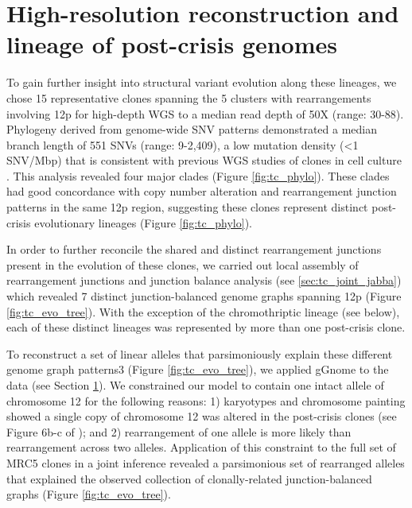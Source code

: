 \documentclass[phd,tocprelim]{cornell}
\renewcommand{\caption}[1]{\singlespacing\hangcaption{#1}\normalspacing}
\begin{document}


\section{High-resolution reconstruction and lineage of post-crisis genomes} \label{sec:tc_joint_decomposition}
To gain further insight into structural variant evolution along these lineages, we chose 15 representative clones spanning the 5 clusters with rearrangements involving 12p for high-depth WGS to a median read depth of 50X (range: 30-88). Phylogeny derived from genome-wide SNV patterns demonstrated a median branch length of 551 SNVs (range: 9-2,409), a low mutation density (<1 SNV/Mbp) that is consistent with previous WGS studies of clones in cell culture \cite{Petljak2019-cf}. This analysis revealed four major clades (Figure \ref{fig:tc_phylo}). These clades had good concordance with copy number alteration and rearrangement junction patterns in the same 12p region, suggesting these clones represent distinct post-crisis evolutionary lineages (Figure \ref{fig:tc_phylo}).

In order to further reconcile the shared and distinct rearrangement junctions present in the evolution of these clones, we carried out local assembly of rearrangement junctions and junction balance analysis (see \ref{sec:tc_joint_jabba}) which revealed 7 distinct junction-balanced genome graphs spanning 12p (Figure \ref{fig:tc_evo_tree}). With the exception of the chromothriptic lineage (see below), each of these distinct lineages was represented by more than one post-crisis clone.

To reconstruct a set of linear alleles that parsimoniously explain these different genome graph patterns3 (Figure \ref{fig:tc_evo_tree}), we applied gGnome to the data (see Section \ref{sec:tc_joint_decomposition}). We constrained our model to contain one intact allele of chromosome 12 for the following reasons: 1) karyotypes and chromosome painting showed a single copy of chromosome 12 was altered in the post-crisis clones (see Figure 6b-c of \cite{Dewhurst2021-jk}); and 2) rearrangement of one allele is more likely than rearrangement across two alleles. Application of this constraint to the full set of MRC5 clones in a joint inference revealed a parsimonious set of rearranged alleles that explained the observed collection of clonally-related junction-balanced graphs (Figure \ref{fig:tc_evo_tree}).
\end{document}
